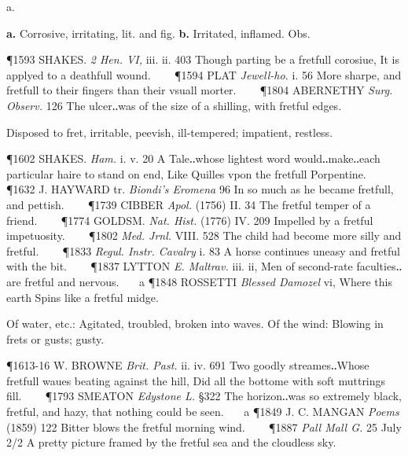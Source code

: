 \begin{description}[wide, labelwidth=!, labelindent=0pt]
 a.

\noindent {}

\vspace{-0.3cm}

\begin{myenumerate}

 \textbf{a.} Corrosive, irritating, lit. and fig. \textbf{b.} Irritated, inflamed. Obs.

\P 1593 SHAKES.  \textit{2 Hen. VI,} iii. ii. 403 Though parting be a fretfull corosiue, It is applyed to a deathfull wound.    
\P 1594 PLAT  \textit{Jewell-ho.} i. 56 More sharpe, and fretfull to their fingers than their vsuall morter.    
\P 1804 ABERNETHY  \textit{Surg. Observ.} 126 The ulcer‥was of the size of a shilling, with fretful edges.

 Disposed to fret, irritable, peevish, ill-tempered; impatient, restless.

\P 1602 SHAKES.  \textit{Ham.} i. v. 20 A Tale‥whose lightest word would‥make‥each particular haire to stand on end, Like Quilles vpon the fretfull Porpentine.    
\P 1632 J. HAYWARD tr. \textit{Biondi's Eromena} 96 In so much as he became fretfull, and pettish.    
\P 1739 CIBBER  \textit{Apol.} (1756) II. 34 The fretful temper of a friend.    
\P 1774 GOLDSM.  \textit{Nat. Hist.} (1776) IV. 209 Impelled by a fretful impetuosity.    
\P 1802  \textit{Med. Jrnl.} VIII. 528 The child had become more silly and fretful.    
\P 1833 \textit{Regul.  Instr. Cavalry} i. 83 A horse continues uneasy and fretful with the bit.    
\P 1837 LYTTON  \textit{E. Maltrav.} iii. ii, Men of second-rate faculties‥are fretful and nervous.    a 
\P 1848 ROSSETTI  \textit{Blessed Damozel} vi, Where this earth Spins like a fretful midge.

 Of water, etc.: Agitated, troubled, broken into waves.  Of the wind: Blowing in frets or gusts; gusty.

\P 1613-16 W. BROWNE  \textit{Brit. Past.} ii. iv. 691 Two goodly streames‥Whose fretfull waues beating against the hill, Did all the bottome with soft muttrings fill.    
\P 1793 SMEATON  \textit{Edystone L.} §322 The horizon‥was so extremely black, fretful, and hazy, that nothing could be seen.    a 
\P 1849 J. C. MANGAN  \textit{Poems} (1859) 122 Bitter blows the fretful morning wind.    
\P 1887  \textit{Pall Mall G.} 25 July 2/2 A pretty picture framed by the fretful sea and the cloudless sky.


\end{myenumerate}
\end{description}
